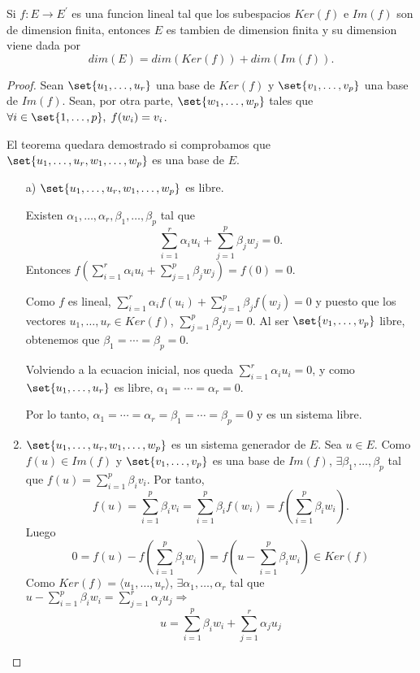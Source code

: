 \begin{theorem}
	Si \(f \colon E \to E^\prime \) es una funcion lineal tal que los subespacios \(Ker(f)\) e \(Im(f )\) son de dimension finita, entonces \(E \) es tambien de dimension finita y su dimension viene dada por
	\[
		dim(E) = dim(Ker(f)) + dim(Im(f)).
	\]
\end{theorem}
\begin{proof}
	Sean \(\set{u_1,\ldots,u_r }\) una base de \(Ker(f )\) y \(\set{v_1,\ldots,v_p }\) una base de \(Im(f )\). Sean, por otra parte, \(\set{w_1,\ldots,w_p }\) tales que \(\forall i \in \set{1,\ldots,p}, \; f(w_i) = v_i \).

	El teorema quedara demostrado si comprobamos que \(\set{u_1,\ldots,u_r,w_1,\ldots,w_p }\) es una base de \(E \).
	\begin{enumerate}
		\item[a)] \(\set{u_1,\ldots,u_r,w_1,\ldots,w_p }\) es libre.

			Existen \(\alpha_{1}, \ldots, \alpha_r, \beta_1, \ldots, \beta_p \) tal que
			\[
				\sum_{i=1}^{r} \alpha_i u_i + \sum_{j=1}^{p } \beta_j w_j = 0.
			\]
			Entonces \(f(\sum_{i=1}^{r} \alpha_i u_i + \sum_{j=1}^{p } \beta_j w_j) = f(0) = 0 \).

			Como \(f \) es lineal, \(\sum_{i=1}^{r} \alpha_i f(u_i) + \sum_{j=1}^{p } \beta_j f(w_j) = 0\)  y puesto que los vectores \(u_1,\ldots,u_r \in Ker(f )\), \(\sum_{j =1}^{p } \beta_j v_j = 0 \). Al ser \(\set{v_1,\ldots,v_p }\) libre, obtenemos que \(\beta_1 = \cdots = \beta_p = 0 \).

			Volviendo a la ecuacion inicial, nos queda \(\sum_{i=1}^{r } \alpha_i u_i = 0 \), y como \(\set{u_1,\ldots,u_r }\) es libre, \(\alpha_1 = \cdots = \alpha_r = 0\).

			Por lo tanto, \(\alpha_1 = \cdots = \alpha_r = \beta_1 = \cdots = \beta_p = 0 \) y es un sistema libre.

		\item \(\set{u_1,\ldots,u_r,w_1,\ldots,w_p }\) es un sistema generador de \(E \). Sea \( u \in E \). Como \(f(u) \in Im(f)\) y \(\set{v_1,\ldots,v_p }\) es una base de \(Im(f )\), \(\exists \beta_1,\ldots,\beta_p \) tal que \(f(u ) = \sum_{i=1}^{p } \beta_i v_i \). Por tanto,
		      \[
			      f(u) = \sum_{i=1}^{p } \beta_i v_i = \sum_{i=1}^{p } \beta_i f(w_i) = f(\sum_{i=1}^{p } \beta_i w_i).
		      \]
		      Luego
		      \[
			      0 = f(u) - f(\sum_{i=1}^{p } \beta_i w_i ) = f(u - \sum_{i=1}^{p } \beta_i w_i) \in Ker(f)
		      \]
		      Como \(Ker(f) = \langle u_1, \ldots, u_r \rangle\), \(\exists \alpha_1, \ldots, \alpha_r \) tal que \(u - \sum_{i=1}^{p } \beta_i w_i = \sum_{j=1}^{r } \alpha_j u_j \Rightarrow \)
		      \[
			      u = \sum_{i=1}^{p } \beta_i w_i + \sum_{j=1}^{r } \alpha_j u_j
		      \]
	\end{enumerate}
\end{proof}